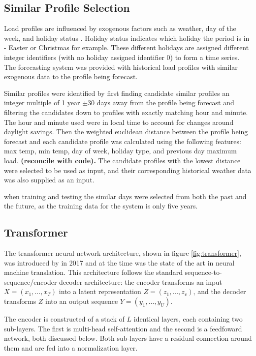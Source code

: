 \documentclass[conference]{IEEEtran}
\begin{document}
\subsection{Similar Profile Selection}
Load profiles are influenced by exogenous factors such as weather, day of the week, and holiday status \cite{Weron2006}.
Holiday status indicates which holiday the period is in - Easter or Christmas for example.
These different holidays are assigned different integer identifiers (with no holiday assigned identifier 0) to form a time series.
The forecasting system was provided with historical load profiles with similar exogenous data to the profile being forecast.
\par
Similar profiles were identified by first finding candidate similar profiles an integer multiple of 1 year $\pm$30 days away from the profile being forecast and filtering the candidates down to profiles with exactly matching hour and minute.
The hour and minute used were in local time to account for changes around daylight savings.
Then the weighted euclidean distance between the profile being forecast and each candidate profile was calculated using the following features: max temp, min temp, day of week, holiday type, and previous day maximum load. \textbf{(reconcile with code).}
The candidate profiles with the lowest distance were selected to be used as input, and their corresponding historical weather data was also supplied as an input.
\par
when training and testing the similar days were selected from both the past and the future, as the training data for the system is only five years.
\subsection{Transformer}
The transformer neural network architecture, shown in figure \ref{fig:transformer}, was introduced by \cite{Vaswani2017} in 2017 and at the time was the state of the art in neural machine translation.
This architecture follows the standard sequence-to-sequence/encoder-decoder architecture: the encoder transforms an input $X = (x_1, ..., x_T)$ into a latent representation $Z = (z_1, ..., z_v)$, and the decoder transforms $Z$ into an output sequence $Y = (y_1, ..., y_U)$.

The encoder is constructed of a stack of $L$ identical layers, each containing two sub-layers.
The first is multi-head self-attention and the second is a feedfoward network, both discussed below.
Both sub-layers have a residual connection around them and are fed into a normalization layer.
\end{document}
